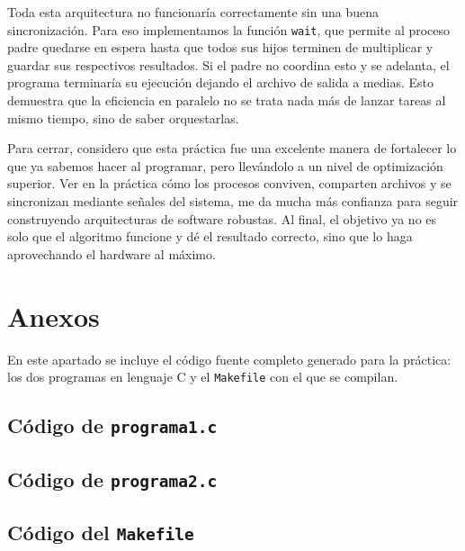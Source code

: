 Toda esta arquitectura no funcionaría correctamente sin una buena sincronización. Para eso implementamos la función \texttt{wait}, que permite al proceso padre quedarse en espera hasta que todos sus hijos terminen de multiplicar y guardar sus respectivos resultados. Si el padre no coordina esto y se adelanta, el programa terminaría su ejecución dejando el archivo de salida a medias. Esto demuestra que la eficiencia en paralelo no se trata nada más de lanzar tareas al mismo tiempo, sino de saber orquestarlas.

Para cerrar, considero que esta práctica fue una excelente manera de fortalecer lo que ya sabemos hacer al programar, pero llevándolo a un nivel de optimización superior. Ver en la práctica cómo los procesos conviven, comparten archivos y se sincronizan mediante señales del sistema, me da mucha más confianza para seguir construyendo arquitecturas de software robustas. Al final, el objetivo ya no es solo que el algoritmo funcione y dé el resultado correcto, sino que lo haga aprovechando el hardware al máximo.


\section{Anexos}
\label{sec:prac02:anexos}

En este apartado se incluye el código fuente completo generado para la práctica: los dos programas en lenguaje C y el \texttt{Makefile} con el que se compilan.

\subsection{Código de \texttt{programa1.c}}
\label{sec:prac02:anexo:programa1}



\subsection{Código de \texttt{programa2.c}}
\label{sec:prac02:anexo:programa2}



\subsection{Código del \texttt{Makefile}}
\label{sec:prac02:anexo:makefile}


